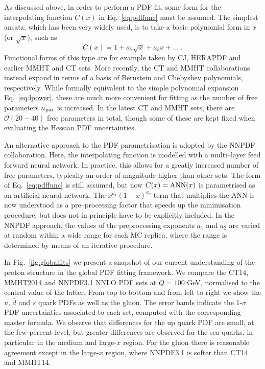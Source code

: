As discussed above, in order to perform a  PDF fit, some form for the interpolating function $C(x)$ in Eq.~\eqref{eq:pdffunc}
must be assumed.
%
The simplest ansatz, which has been very widely used, is to take a basic polynomial form in $x$ (or $\sqrt{x}$), such as
\begin{equation}\label{eq:lpower}
C(x)=1+a_2\sqrt{x}+a_3 x+...\;.
\end{equation}
Functional forms of this type are for example taken by CJ, HERAPDF and earlier MMHT and CT sets. More recently, the CT and MMHT collaborations instead expand in terms of a basis of  Bernstein and Chebyshev polynomials, respectively.
%
While formally equivalent to the simple polynomial expansion
Eq.~\eqref{eq:lpower}, these are much more convenient for fitting as the number of free parameters $n_{\rm par}$ is increased.
%
In the latest CT and MMHT sets, there are $\mathcal{O}(20-40)$ free parameters in total, though some of these are kept fixed when evaluating the
Hessian PDF uncertainties.

An alternative approach to the PDF parametrisation is adopted
by the NNPDF collaboration. Here, the interpolating function is modelled with a multi--layer feed forward neural network. In practice, this allows for a greatly increased number of free parameters, typically an order of magnitude higher than other sets.
%
The form of Eq.~\eqref{eq:pdffunc} is still assumed, but
now $C(x)={\rm ANN}(x)$ is parametrised as an artificial
neural network.
%
The $x^{a_1}(1-x)^{a_2}$ term that multiplies the ANN is now understood
as a pre--processing factor that speeds up the minimisation procedure,
but does not in principle have to be explicitly included.
%
In the NNPDF approach, the values of the preprocessing exponents
$a_1$ and $a_2$ are varied at random within a wide range for each MC
replica, where the range is determined by means of an iterative
procedure.

In Fig.~\ref{fig:globalfits}
we present a snapshot of our current understanding
of the proton structure in the global PDF fitting framework.
%
We compare the CT14, MMHT2014
  and NNPDF3.1 NNLO PDF sets at $Q=100$ GeV, normalised
  to the central value of the latter.
  From top to bottom and from left to right we show the
  $u$, $\bar{d}$ and $s$ quark PDFs as well as the gluon.
  The error bands indicate the 1-$\sigma$ PDF uncertainties
  associated to each set, computed with the corresponding
  master formula.
  We observe that differences for the up quark PDF
  are small, at the few percent level, but greater differences
  are observed for the sea quarks, in particular
  in the medium and large-$x$ region.
  For the gluon there is reasonable agreement except
  in the large-$x$ region, where NNPDF3.1 is softer than
  CT14 and MMHT14.


